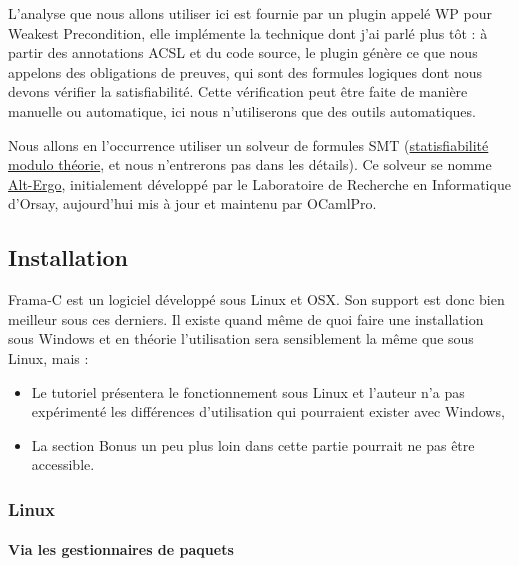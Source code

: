\documentclass[12pt,francais,]{scrbook}
\newenvironment{zdsalertblock}[1]{%
  \tcolorbox[beamer,%
    noparskip,breakable,
    colback=LightCoral,colframe=DarkRed,%
    colbacklower=Tomato,%
    title=#1]
}{\endtcolorbox}
\begin{document}
L'analyse que nous allons utiliser ici est fournie par un plugin appelé
WP pour Weakest Precondition, elle implémente la technique dont j'ai
parlé plus tôt : à partir des annotations ACSL et du code source, le
plugin génère ce que nous appelons des obligations de preuves, qui sont
des formules logiques dont nous devons vérifier la satisfiabilité. Cette
vérification peut être faite de manière manuelle ou automatique, ici
nous n'utiliserons que des outils automatiques.

Nous allons en l'occurrence utiliser un solveur de formules SMT
(\href{https://fr.wikipedia.org/wiki/Satisfiability_modulo_theories}{statisfiabilité
modulo théorie}, et nous n'entrerons pas dans les détails). Ce solveur
se nomme \href{http://alt-ergo.lri.fr/}{Alt-Ergo}, initialement
développé par le Laboratoire de Recherche en Informatique d'Orsay,
aujourd'hui mis à jour et maintenu par OCamlPro.

\subsection{Installation}\label{installation}

Frama-C est un logiciel développé sous Linux et OSX. Son support est
donc bien meilleur sous ces derniers. Il existe quand même de quoi faire
une installation sous Windows et en théorie l'utilisation sera
sensiblement la même que sous Linux, mais :

\begin{zdsalertblock}{Attention}
  \begin{itemize}
  \item Le tutoriel présentera le
    fonctionnement sous Linux et l'auteur n'a pas expérimenté les
    différences d'utilisation qui pourraient exister avec
    Windows,
  \item La section \og{}Bonus\fg{} un peu plus loin dans cette
    partie pourrait ne pas être accessible.
  \end{itemize}
\end{zdsalertblock}

\subsubsection{Linux}\label{linux}

\paragraph{Via les gestionnaires de
paquets}\label{via-les-gestionnaires-de-paquets}
\end{document}
